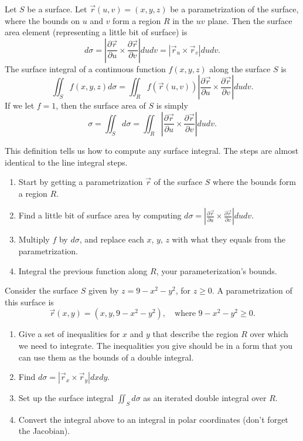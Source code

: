 \begin{definition}
 Let $S$ be a surface.  Let $\vec r(u,v)=(x,y,z)$ be a parametrization of the surface, where the bounds on $u$ and $v$ form a region $R$ in the $uv$ plane.  Then the surface area element (representing a little bit of surface) is 
$$d\sigma =\left |\frac{\partial \vec r}{\partial u} \times \frac{\partial \vec r}{\partial v}\right| dudv = \left|\vec r_u\times\vec r_v\right|dudv.$$
The surface integral of a continuous function $f(x,y,z)$ along the surface $S$ is 
$$\iint_S f(x,y,z) d\sigma = \iint_R f(\vec r(u,v)) \left |\frac{\partial \vec r}{\partial u} \times \frac{\partial \vec r}{\partial v}\right| dudv.$$
If we let $f=1$, then the surface area of $S$ is simply
$$\sigma = \iint_S d\sigma = \iint_R \left |\frac{\partial \vec r}{\partial u} \times \frac{\partial \vec r}{\partial v}\right| dudv.$$
\end{definition}

This definition tells us how to compute any surface integral. The steps are almost identical to the line integral steps.
\begin{enumerate}
 \item Start by getting a parametrization $\vec r$ of the surface $S$ where the bounds form a region $R$. 
 \item Find a little bit of surface area by computing $d\sigma =\left |\frac{\partial \vec r}{\partial u} \times \frac{\partial \vec r}{\partial v}\right| dudv.$
 \item Multiply $f$ by $d\sigma$, and replace each $x$, $y$, $z$ with what they equals from the parametrization.
 \item Integral the previous function along $R$, your parameterization's bounds.
\end{enumerate}

\begin{problem}
 Consider the surface $S$ given by $z=9-x^2-y^2$, for $z\geq 0$. A parametrization of this surface is $$\vec r(x,y) = (x,y,9-x^2-y^2),\quad \text{where } 9-x^2-y^2\geq 0.$$ 
\begin{enumerate}
 \item Give a set of inequalities for $x$ and $y$ that describe the region $R$ over which we need to integrate. The inequalities you give should be in a form that you can use them as the bounds of a double integral.
 \item Find $d\sigma = \left|\vec r_x\times \vec r_y\right|dxdy$.
 \item Set up the surface integral $\iint_S d\sigma$ as an iterated double integral over $R$. 
 \item Convert the integral above to an integral in polar coordinates (don't forget the Jacobian).
\end{enumerate}
\end{problem}


